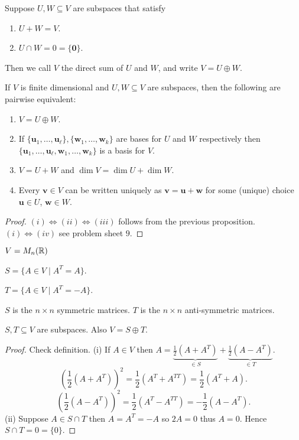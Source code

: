 \documentclass[10pt, a4paper]{article}
\newcommand{\mbf}[1]{\mathbf{#1}}
\begin{document}
\begin{definition}
    Suppose $U, W \subseteq V$ are subspaces that satisfy
    \begin{enumerate}[label = (\roman*)]
        \item $U + W = V$.
        \item $U \cap W = 0 = \{\mbf{0}\}$.
    \end{enumerate}
    Then we call $V$ the direct sum of $U$ and $W$,
    and write $V = U \oplus W$.
\end{definition}

\begin{proposition}
    If $V$ is finite dimensional and $U, W \subseteq V$ are subspaces,
    then the following are pairwise equivalent:
    \begin{enumerate}[label = (\roman*)]
        \item $V = U \oplus W$.
        \item If $\{\mbf{u}_1, \dotsc, \mbf{u}_{\ell}\}, \{\mbf{w}_1, \dotsc, \mbf{w}_k\}$ are bases for $U$ and $W$ respectively then $\{\mbf{u}_1, \dotsc, \mbf{u}_{\ell}, \mbf{w}_1, \dotsc, \mbf{w}_k\}$ is a basis for $V$.
        \item $V = U + W$ and $\dim{V} = \dim{U} + \dim{W}$.
        \item Every $\mbf{v} \in V$ can be written uniquely as $\mbf{v} = \mbf{u} + \mbf{w}$ for some
        (unique)
        choice $\mbf{u} \in U$,
        $\mbf{w} \in W$.
    \end{enumerate}
    \begin{proof}
        $(i) \iff (ii) \iff (iii)$ follows from the previous proposition.
        $(i) \iff (iv)$ see problem sheet $9$.
    \end{proof}
\end{proposition}

\begin{example}
    $V = M_n(\mathbb{R})$
    
    $S = \{A \in V \mid A ^ T = A\}$.

    $T = \{A \in V \mid A ^ T = -A\}$.

    $S$ is the $n \times n$ symmetric matrices.
    $T$ is the $n \times n$ anti-symmetric matrices.

    $S, T \subseteq V$ are subspaces.
    Also $V = S \oplus T$.
    \begin{proof}
        Check definition.
        (i)
        If $A \in V$ then $A = \underbrace{\frac{1}{2}(A + A ^ T)}_{\in S} + \underbrace{\frac{1}{2}(A - A ^ T)}_{\in T}$.
        \[
        \left(\frac{1}{2}(A + A ^ T)\right) ^ 2 = \frac{1}{2}(A ^ T + A ^ {TT}) = \frac{1}{2}(A ^ T + A).
        \]
        \[
        \left(\frac{1}{2}(A - A ^ T)\right) ^ 2 = \frac{1}{2}(A ^ T - A ^ {TT}) = -\frac{1}{2}(A - A ^ T).
        \]
        (ii)
        Suppose $A \in S \cap T$ then $A = A ^ T = -A$ so $2A = 0$ thus $A = 0$.
        Hence $S \cap T = 0 = \{0\}$.
    \end{proof}
\end{example}
\end{document}
